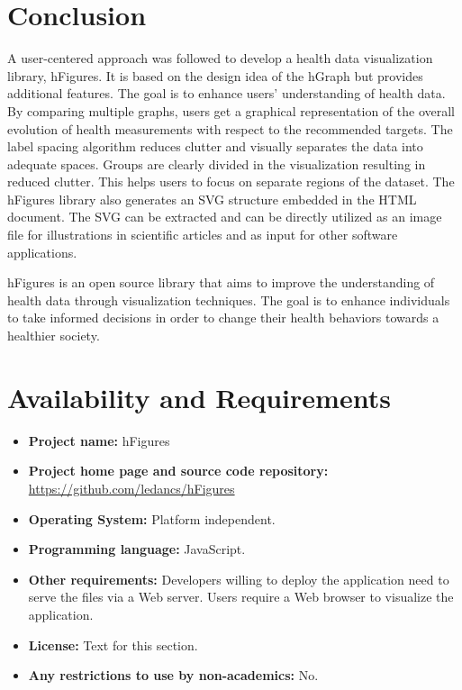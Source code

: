 \documentclass[twocolumn]{bmcart}%
\begin{document}
\section*{Conclusion}

A user-centered approach was followed to develop a health data visualization library, hFigures. It is based on the design idea of the hGraph but provides additional features. The goal is to enhance users' understanding of health data.
By comparing multiple graphs, users get a graphical representation of the overall evolution of health measurements with respect to the recommended targets. The label spacing algorithm reduces clutter and visually separates the data into adequate spaces. Groups are clearly divided in the visualization resulting in reduced clutter. This helps users to focus on separate regions of the dataset. The hFigures library also generates an SVG structure embedded in the HTML document. The SVG can be extracted and can be directly utilized as an image file for illustrations in scientific articles and as input for other software applications.

hFigures is an open source library that aims to improve the understanding of health data through visualization techniques. The goal is to enhance individuals to take informed decisions in order to change their health behaviors towards a healthier society.


\section*{Availability and Requirements}

\begin{itemize}
\item \textbf{Project name:} hFigures
\item \textbf{Project home page and source code repository:} \url{https://github.com/ledancs/hFigures}
\item \textbf{Operating System:} Platform independent.
\item \textbf{Programming language:} JavaScript.
\item \textbf{Other requirements:} Developers willing to deploy the application need to serve the files via a Web server. Users require a Web browser to visualize the application.
\item \textbf{License:} Text for this section.
\item \textbf{Any restrictions to use by non-academics:} No.
\end{itemize}
\end{document}

